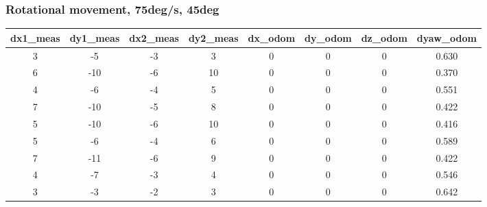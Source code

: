 \documentclass[a4paper, 12pt]{article}
\begin{document}
    \subsubsection{Rotational movement, 75deg/s, 45deg}

    \begin{table}[H]
    \scriptsize
    \begin{tabular}{@{}cccccccc@{}}
    \toprule
    \textbf{dx1\_meas} & \textbf{dy1\_meas} & \textbf{dx2\_meas} & \textbf{dy2\_meas} & \textbf{dx\_odom} & \textbf{dy\_odom} & \textbf{dz\_odom} & \textbf{dyaw\_odom} \\ \midrule
    3                      & -5                     & -3                     & 3                      & 0                 & 0                 & 0                 & 0.630               \\
    6                      & -10                    & -6                     & 10                     & 0                 & 0                 & 0                 & 0.370               \\
    4                      & -6                     & -4                     & 5                      & 0                 & 0                 & 0                 & 0.551               \\
    7                      & -10                    & -5                     & 8                      & 0                 & 0                 & 0                 & 0.422               \\
    5                      & -10                    & -6                     & 10                     & 0                 & 0                 & 0                 & 0.416               \\
    5                      & -6                     & -4                     & 6                      & 0                 & 0                 & 0                 & 0.589               \\
    7                      & -11                    & -6                     & 9                      & 0                 & 0                 & 0                 & 0.422               \\
    4                      & -7                     & -3                     & 4                      & 0                 & 0                 & 0                 & 0.546               \\
    3                      & -3                     & -2                     & 3                      & 0                 & 0                 & 0                 & 0.642               \\

\end{tabular}
\end{table}
\end{document}
